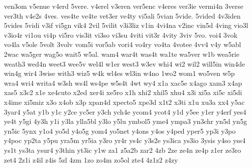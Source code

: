 {ven3om
v5enue
v4erd
5vere.
v4erel
v3eren
ver5enc
v4eres
ver3ie
vermi4n
3verse
ver3th
v4e2s
4ves.
ves4te
ve4te
vet3er
ve4ty
vi5ali
5vian
5vide.
5vided
4v3iden
5vides
5vidi
v3if
vi5gn
vik4
2vil
5vilit
v3i3liz
v1in
4vi4na
v2inc
vin5d
4ving
vio3l
v3io4r
vi1ou
vi4p
vi5ro
vis3it
vi3so
vi3su
4viti
vit3r
4vity
3viv
5vo.
voi4
3vok
vo4la
v5ole
5volt
3volv
vom5i
vor5ab
vori4
vo4ry
vo4ta
4votee
4vv4
v4y
w5abl
2wac
wa5ger
wag5o
wait5
w5al.
wam4
war4t
was4t
wa1te
wa5ver
w1b
wea5rie
weath3
wed4n
weet3
wee5v
wel4l
w1er
west3
w3ev
whi4
wi2
wil2
will5in
win4de
win4g
wir4
3wise
with3
wiz5
w4k
wl4es
wl3in
w4no
1wo2
wom1
wo5ven
w5p
wra4
wri4
writa4
w3sh
ws4l
ws4pe
w5s4t
4wt
wy4
x1a
xac5e
x4ago
xam3
x4ap
xas5
x3c2
x1e
xe4cuto
x2ed
xer4i
xe5ro
x1h
xhi2
xhil5
xhu4
x3i
xi5a
xi5c
xi5di
x4ime
xi5miz
x3o
x4ob
x3p
xpan4d
xpecto5
xpe3d
x1t2
x3ti
x1u
xu3a
xx4
y5ac
3yar4
y5at
y1b
y1c
y2ce
yc5er
y3ch
ych4e
ycom4
ycot4
y1d
y5ee
y1er
y4erf
yes4
ye4t
y5gi
4y3h
y1i
y3la
ylla5bl
y3lo
y5lu
ymbol5
yme4
ympa3
yn3chr
yn5d
yn5g
yn5ic
5ynx
y1o4
yo5d
y4o5g
yom4
yo5net
y4ons
y4os
y4ped
yper5
yp3i
y3po
y4poc
yp2ta
y5pu
yra5m
yr5ia
y3ro
yr4r
ys4c
y3s2e
ys3ica
ys3io
3ysis
y4so
yss4
ys1t
ys3ta
ysur4
y3thin
yt3ic
y1w
za1
z5a2b
zar2
4zb
2ze
ze4n
ze4p
z1er
ze3ro
zet4
2z1i
z4il
z4is
5zl
4zm
1zo
zo4m
zo5ol
zte4
4z1z2
z4zy
}
